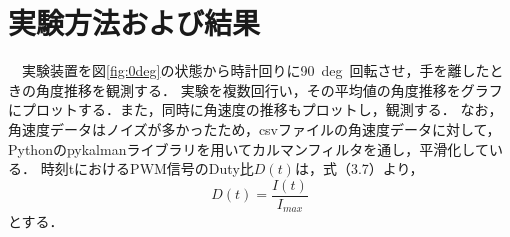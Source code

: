 \section{実験方法および結果}
　実験装置を図\ref{fig:0deg}の状態から時計回りに90~deg~回転させ，手を離したときの角度推移を観測する．
実験を複数回行い，その平均値の角度推移をグラフにプロットする．また，同時に角速度の推移もプロットし，観測する．
なお，角速度データはノイズが多かったため，csvファイルの角速度データに対して，Pythonのpykalmanライブラリを用いてカルマンフィルタを通し，平滑化している．
時刻tにおけるPWM信号のDuty比$D(t)$は，式（3.7）より，
\begin{equation}
	D(t)=\frac{I(t)}{I_{max}}
\end{equation}
とする．

